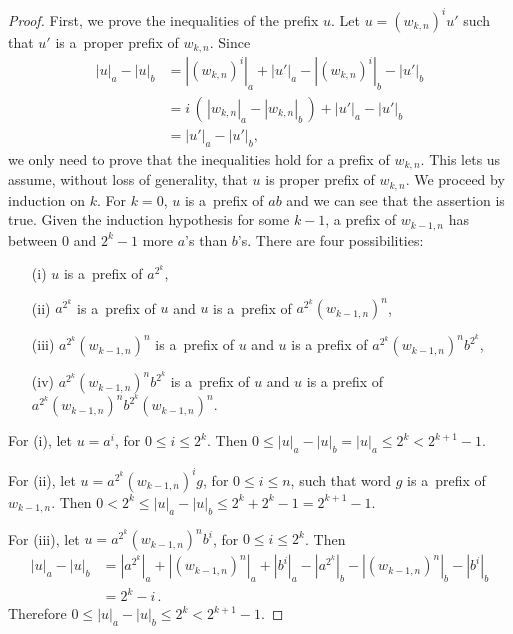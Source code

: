 \begin{proof}
    First, we prove the inequalities of the prefix $u$. Let $u = {(w_{k,n})}^i u'$ such that $u'$ is a~proper prefix of $w_{k,n}$. Since
    \begin{align*}
        |u|_a - |u|_b &= |{(w_{k,n})}^i|_a + |u'|_a - |{(w_{k,n})}^i|_b - |u'|_b \\
        &= i \, ( \, |w_{k,n}|_a - |w_{k,n}|_b \, ) + |u'|_a - |u'|_b \\
        &= |u'|_a - |u'|_b,
    \end{align*}
    we only need to prove that the inequalities hold for a prefix of $w_{k,n}$. This lets us assume, without loss of generality, that $u$ is proper prefix of $w_{k,n}$. We proceed by induction on $k$. For $k = 0$, $u$ is a~prefix of $ab$ and we can see that the assertion is true. Given the induction hypothesis for some $k - 1$, a prefix of $w_{k-1,n}$ has between $0$ and $2^k-1$ more $a$'s than $b$'s. There are four possibilities:
    \begin{itemize}
        \item[(i)] $u$ is a~prefix of $a^{2^k}$,
        \item[(ii)] $a^{2^k}$ is a~prefix of $u$ and $u$ is a~prefix of $a^{2^k} {(w_{k-1,n})}^n$,
        \item[(iii)] $a^{2^k} {(w_{k-1,n})}^n$ is a~prefix of $u$ and $u$ is a prefix of $a^{2^k} {(w_{k-1,n})}^n b^{2^k}$,
        \item[(iv)] $a^{2^k} {(w_{k-1,n})}^n b^{2^k}$ is a~prefix of $u$ and $u$ is a prefix of $a^{2^k} {(w_{k-1,n})}^n b^{2^k} {(w_{k-1,n})}^n$.
    \end{itemize}

    For (i), let $u = a^i$, for $0 \leq i \leq 2^k$. Then $0 \leq |u|_a - |u|_b = |u|_a \leq 2^k < 2^{k+1}-1$.

    For (ii), let $u = a^{2^k} {(w_{k-1,n})}^i g$, for $0 \leq i \leq n$, such that word $g$ is a~prefix of $w_{k-1,n}$. Then $0 < 2^k \leq |u|_a - |u|_b \leq 2^k+2^k-1 = 2^{k+1}-1$.

    For (iii), let $u = a^{2^k} {(w_{k-1,n})}^n b^i$, for $0 \leq i \leq 2^k$. Then
    \begin{align*}
        |u|_a - |u|_b &= |a^{2^k}|_a + |{(w_{k-1,n})}^n|_a + |b^i|_a - |a^{2^k}|_b - |{(w_{k-1,n})}^n|_b - |b^i|_b \\
        &= 2^k - i \, .
    \end{align*}
    Therefore $0 \leq |u|_a - |u|_b \leq 2^k < 2^{k+1}-1$.


\end{proof}
